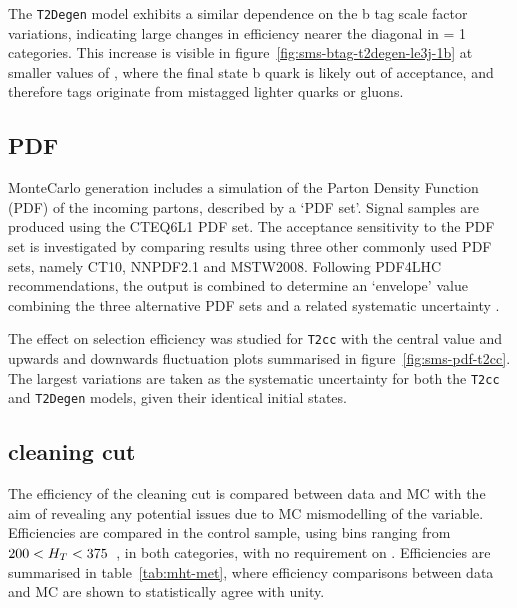 The \texttt{T2Degen} model exhibits a similar dependence on the b tag scale
factor variations, indicating large changes in efficiency nearer the diagonal in
\nb = 1 categories. This increase is visible in
figure~\ref{fig:sms-btag-t2degen-le3j-1b} at smaller values of \deltam, where
the final state b quark is likely out of acceptance, and therefore tags
originate from mistagged lighter quarks or gluons.


\subsection{PDF}
MonteCarlo generation includes a simulation of the Parton Density Function (PDF)
of the incoming partons, described by a `PDF set'. Signal samples are produced
using the \textsc{CTEQ6L1} PDF set. The acceptance 
sensitivity to the PDF set is investigated by comparing results using three
other commonly used PDF sets, namely \textsc{CT10}, \textsc{NNPDF2.1} and
\textsc{MSTW2008}. Following PDF4LHC recommendations, the output is 
combined to determine an `envelope' value combining the three alternative PDF 
sets and a related systematic uncertainty \cite{pdf4lhc}.

The effect on selection efficiency was studied for \texttt{T2cc} with the
central value and upwards and downwards fluctuation plots summarised in
figure~\ref{fig:sms-pdf-t2cc}. The largest variations are taken as the
systematic uncertainty for both the \texttt{T2cc} and \texttt{T2Degen} models,
given their identical initial states.

\subsection{\mhtmet cleaning cut}
\label{sec:mhtmet_syst}
The efficiency of the \mhtmet cleaning cut is compared between data and MC with 
the aim of revealing any potential issues due to MC mismodelling of the 
variable. Efficiencies are compared in the \mj control sample, using \HT bins 
ranging from $200 < H_T < 375$~\gev, in both \nj categories, with no requirement
on \nb. Efficiencies are summarised in table~\ref{tab:mht-met}, where 
efficiency comparisons between data and MC are shown to statistically agree
with unity.


